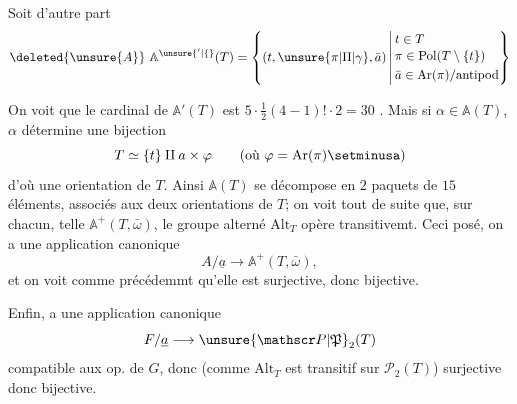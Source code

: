 Soit d'autre part
\[
\deleted{\unsure{A}}\ \mathbb A^{\unsure{'|\{}}(T)=
\left\{(t,\unsure{\pi|\Pi|\gamma},\bar a)\,\middle|\,
\begin{aligned}
&t\in T\\[-2pt]
&\pi\in\mathrm{Pol}(T\setminus\{t\})\\
&\bar a\in\mathrm{Ar}(\pi)/\mathrm{antipod}
\end{aligned}\right\}
\]

On voit que le cardinal de $\mathbb A'(T)$ est $5\cdot\frac12(4-1)!\cdot2=30$ . Mais si $\alpha\in\mathbb A(T)$, $\alpha$ détermine une bijection
\[
T\simeq\{t\}\amalg a\times\varphi\qquad
(\text{où }\varphi=\mathrm{Ar}(\pi)\setminusa)
\]
d'où une orientation de $T$. Ainsi $\mathbb A(T)$ se décompose en $2$ paquets de $15$ éléments, associés aux deux orientations \inserted{$\unsure{\bar\omega|\varpi},-\bar\omega$} de $T$; on voit tout de suite que, sur chacun, telle $\mathbb A^+(T,\bar\omega)$, le groupe alterné $\mathrm{Alt}_T$ opère transitivemt. Ceci posé, on a une application canonique
\[
 A/\underline a\longrightarrow\mathbb A^+(T,\bar\omega),
\]
 et on voit comme précédemmt qu'elle est surjective, donc bijective.

Enfin,  a une application canonique
\[
 F/\underline a\longrightarrow\unsure{\mathscr P|\mathfrak P}_2(T)
\]
compatible aux op. de $G$, donc (comme $\mathrm{Alt}_T$ est transitif sur $\mathscr P_2(T)$) surjective donc bijective.
